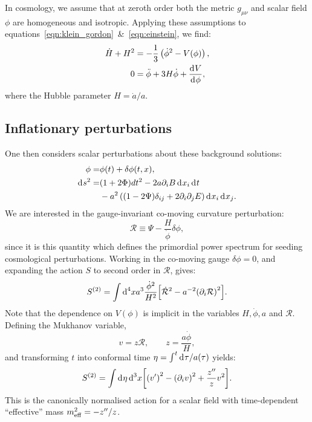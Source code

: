 In cosmology, we assume that at zeroth order both the metric \(g_{\mu\nu}\) and scalar field \(\phi\) are homogeneous and isotropic. Applying these assumptions to equations~\eqref{eqn:klein_gordon}~\&~\eqref{eqn:einstein}, we find:
\begin{align}
  \dot{H}+H^2 &= -\frac{1}{3}\left( \dot{\phi}^2 - V(\phi) \right),
  \label{eqn:Raychaudhuri}\\
  0&=\ddot{\phi} + 3H\dot{\phi} + \frac{\operatorname{d}^{}\!{V}}{\operatorname{d}^{}\!{\phi}},
\end{align}
where the Hubble parameter \(H = \dot{a}/a\).
\subsection{Inflationary perturbations}
One then considers scalar perturbations about these background solutions:
\begin{align}
  \phi=&\phi(t) + \delta\phi(t,x),
  \label{eqn:phi_perturbation} \\
  \operatorname{d}^{}\!{s}^2 =& (1+2\Phi)dt^2 - 2a\partial_i B\operatorname{d}^{}\!{x_i} \operatorname{d}^{}\!{t} \nonumber\\
  &-a^2\left( (1-2\Psi)\delta_{ij} + 2\partial_i\partial_j E  \right)\operatorname{d}^{}\!{x_i} \operatorname{d}^{}\!{x_j}.
\end{align}
We are interested in the gauge-invariant co-moving curvature perturbation:
\begin{equation}
  \mathcal{R}\equiv \Psi - \frac{H}{\dot{\phi}}\delta\phi,
  \label{eqn:R_action}
\end{equation}
since it is this quantity which defines the primordial power spectrum for seeding cosmological perturbations. Working in the co-moving gauge \(\delta\phi=0\), and expanding the action \(S\) to second order in \(\mathcal{R}\), gives:
\begin{equation}
  S^{(2)} =  \int \d[4]{x} a^3\frac{\dot{\phi}^2}{H^2}{\left[ \dot{\mathcal{R}}^2 - a^{-2} {\left( \partial_i\mathcal{R} \right)}^2 \right]}.
  \label{eqn:S2_action}
\end{equation}
Note that the dependence on \(V(\phi)\) is implicit in the variables \(H,\dot{\phi},a\) and \(\mathcal{R}\).
Defining the Mukhanov variable,
\begin{equation}
  v = z\mathcal{R},\qquad z=\frac{a\dot{\phi}}{H},
  \label{eqn:mukhanov_variable}
\end{equation}
and transforming \(t\) into conformal time \(\eta = \int^t \operatorname{d}^{}\!{\tau}/a(\tau) \) yields:
\begin{equation}                                 
  S^{(2)} =  \int \d{\eta} \d[3]{x} {\left[ {\left( \prm{v} \right)}^2 - {\left( \partial_i v \right)}^2 + \frac{\dprm{z}}{z} v^2 \right]}.
  \label{eqn:v_action}
\end{equation}
This is the canonically normalised action for a scalar field with time-dependent ``effective'' mass \(m_\mathrm{eff}^2 = -{{z}^{\prime\prime}}/z\).

